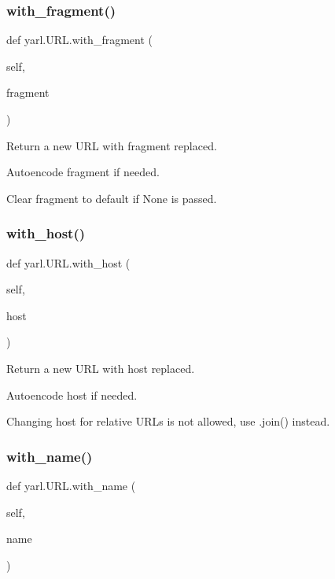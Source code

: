 \subsubsection{\texorpdfstring{with\+\_\+fragment()}{with\_fragment()}}
{\footnotesize\ttfamily def yarl.\+U\+R\+L.\+with\+\_\+fragment (\begin{DoxyParamCaption}\item[{}]{self,  }\item[{}]{fragment }\end{DoxyParamCaption})}

\begin{DoxyVerb}Return a new URL with fragment replaced.

Autoencode fragment if needed.

Clear fragment to default if None is passed.\end{DoxyVerb}
 \mbox{\label{classyarl_1_1_u_r_l_ac827581365dd844bef809bbd939c84d2}} 
\subsubsection{\texorpdfstring{with\+\_\+host()}{with\_host()}}
{\footnotesize\ttfamily def yarl.\+U\+R\+L.\+with\+\_\+host (\begin{DoxyParamCaption}\item[{}]{self,  }\item[{}]{host }\end{DoxyParamCaption})}

\begin{DoxyVerb}Return a new URL with host replaced.

Autoencode host if needed.

Changing host for relative URLs is not allowed, use .join()
instead.\end{DoxyVerb}
 \mbox{\label{classyarl_1_1_u_r_l_ae2bac85701de37b1554094aecd4e5040}} 
\subsubsection{\texorpdfstring{with\+\_\+name()}{with\_name()}}
{\footnotesize\ttfamily def yarl.\+U\+R\+L.\+with\+\_\+name (\begin{DoxyParamCaption}\item[{}]{self,  }\item[{}]{name }\end{DoxyParamCaption})}


